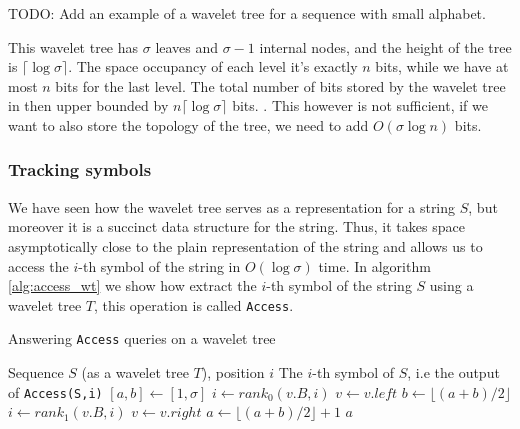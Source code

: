 \begin{example}
    TODO: Add an example of a wavelet tree for a sequence with small alphabet.
\end{example}

\begin{remark} \label{rem:space_occupancy_wavelet_tree}
    This wavelet tree has $\sigma$ leaves and $\sigma-1$ internal nodes, and the height of the tree is $ \lceil \log \sigma \rceil$. The space occupancy of each level it's exactly $n$ bits, while we have at most $n$ bits for the last level. The total number of bits stored by the wavelet tree in then upper bounded by $n \lceil \log \sigma \rceil$ bits. \cite{WTForALL}. This however is not sufficient, if we want to also store the topology of the tree, we need to add $O(\sigma \log n)$ bits.
\end{remark}

\subsubsection*{Tracking symbols}
We have seen how the wavelet tree serves as a representation for a string $S$, but moreover it is a succinct data structure for the string. Thus, it takes space asymptotically close to the plain representation of the string and allows us to access the $i$-th symbol of the string in $O(\log \sigma)$ time. In algorithm \ref{alg:access_wt} we show how extract the $i$-th symbol of the string $S$ using a wavelet tree $T$, this operation is called \texttt{Access}. \\

\begin{algorithm}[h!]
    \caption{Answering \texttt{Access} queries on a wavelet tree}\label{alg:access_wt}
    \begin{algorithmic}
        \Require Sequence $S$ (as a wavelet tree $T$), position $i$
        \Ensure The $i$-th symbol of $S$, i.e the output of \texttt{Access(S,i)}
        \State $[a,b] \gets [1,\sigma]$
         
            \State $i \gets rank_0(v.B,i)$
            \State $v \gets v.left$ 
            \State $b \gets \lfloor (a+b)/2 \rfloor$
        \Else
            \State $i \gets rank_1(v.B,i)$
            \State $v \gets v.right$ 
            \State $a \gets \lfloor (a+b)/2 \rfloor +1$
        \EndIf
        \EndWhile
        \State \Return $a$
    \end{algorithmic}
\end{algorithm}

